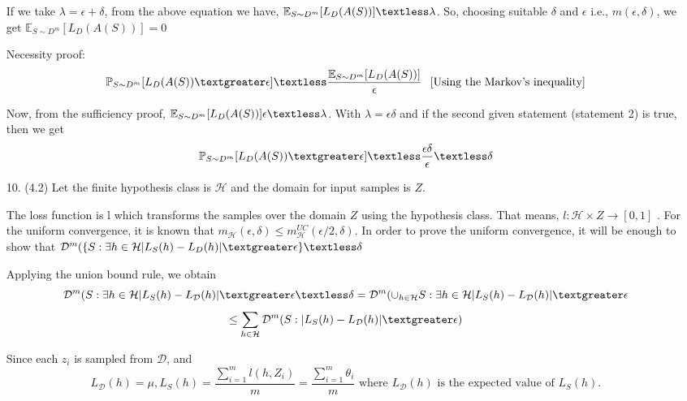 \documentclass[12pt,letterpaper]{article}
\begin{document}
\begin{enumerate}
If we take $\lambda = \epsilon + \delta$, from the above equation we have, $\mathbb{E}_{S\sim D^m}[L_D(A(S))] \textless \lambda$. So, choosing suitable $\delta$ and $\epsilon$ i.e., $m(\epsilon, \delta)$, we get $\mathbb{E}_{S\sim D^m}[L_D(A(S))] = 0$

\vspace{4pt}

Necessity proof:
\begin{equation*}
\mathbb{P}_{S\sim D^m}[L_D(A(S)) \textgreater\epsilon]
\textless \frac{\mathbb{E}_{S\sim D^m}[L_D(A(S))]}{\epsilon}
\textrm{\hspace{4pt} [Using the Markov's inequality]}
\end{equation*}


Now, from the sufficiency proof, $\mathbb{E}_{S\sim D^m} [L_D(A(S))]\epsilon \textless \lambda$. With $\lambda = \epsilon\delta$ and if the second given statement (statement 2) is true, then we get
$$\mathbb{P}_{S\sim D^m}[L_D(A(S)) \textgreater \epsilon] \textless \frac{\epsilon\delta}{\epsilon} \textless \delta$$

\newpage

\item[10.] (4.2)
Let the finite hypothesis class is $\mathcal{H}$ and the domain for input samples is $Z$.

The loss function is l which transforms the samples over the domain $Z$ using the hypothesis class. That means, $l: \mathcal{H} \times Z \to [0, 1]$ . For the uniform convergence, it is known that $m_{\mathcal{H}}(\epsilon, \delta) \leq m_{\mathcal{H}}^{UC}(\epsilon/2, \delta)$.
In order to prove the uniform convergence, it will be enough to show that
$\mathcal{D}^m(\{S: \exists h \in \mathcal{H}|L_S(h) - L_D(h)| \textgreater \epsilon\} \textless \delta$

Applying the union bound rule, we obtain
$$\mathcal{D}^m({S: \exists h \in \mathcal{H}|L_S(h) - L_{\mathcal{D}}(h)| \textgreater \epsilon} \textless \delta = \mathcal{D}^m(\cup_{h\in\mathcal{H}}{S:\exists h\in \mathcal{H}|L_S(h) - L_{\mathcal{D}}(h)| \textgreater \epsilon}$$
$$\leq \sum_{h\in\mathcal{H}}\mathcal{D}^m{(S: |L_S(h) - L_{\mathcal{D}}(h)| \textgreater \epsilon})$$

Since each $z_i$ is sampled from $\mathcal{D}$, and
\begin{equation*}
L_{\mathcal{D}}(h) = \mu,
L_S(h) = \frac{\sum_{i=1}^ml(h,Z_i)}{m} = \frac{\sum_{i=1}^m\theta_i}{m} \hspace{4pt}
\textrm{where $L_{\mathcal{D}}(h)$ is the expected value of $L_S(h)$}. 
\end{equation*}


\end{enumerate}
\end{document}
